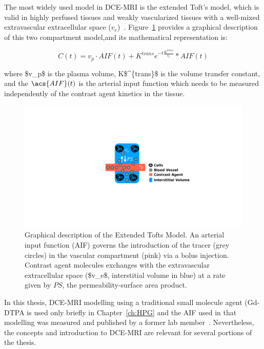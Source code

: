 The most widely used model in \acs{DCE-MRI} is the extended Toft's model, which is valid in highly perfused tissues and weakly vascularized tissues with a well-mixed extravascular extracellular space ($v_e$)~\cite{Sourbron:2013jz}.
Figure~\ref{XTofts} provides a graphical description of this two compartment model,and its mathematical representation is:

\begin{equation}
C(t) = v_p \cdot AIF(t) + K^{trans}e^{-t\frac{K^{trans}}{v_e}} * AIF(t)
\end{equation}

where \acs{$v_p$} is the plasma volume, \acs{K$^{trans}$} is the volume transfer constant, and the $\acs{AIF}(t)$ is the arterial input function which needs to be measured independently of the contrast agent kinetics in the tissue.

\begin{figure}[htbp]
   \centering
   \includegraphics[width=\textwidth]{intro/intro-images/XTofts.pdf}
   \caption[Extended Tofts Model]{Graphical description of the Extended Tofts Model. An arterial input function (\acs{AIF}) governs the introduction of the tracer (grey circles) in the vascular compartment (pink) via a bolus injection. Contrast agent molecules exchanges with the extravascular extracellular space (\acs{$v_e$}, interstitial volume in blue) at a rate given by $PS$, the permeability-surface area product.}
   \label{XTofts}
\end{figure}

In this thesis, \acs{DCE-MRI} modelling using a traditional small molecule agent (\acs{Gd-DTPA} is used only briefly in Chapter~\ref{ch:HPG} and the \acs{AIF} used in that modelling was measured and published by a former lab member~\cite{Moroz:2013ee}.
Nevertheless, the concepts and introduction to \acs{DCE-MRI} are relevant for several portions of the thesis. 


